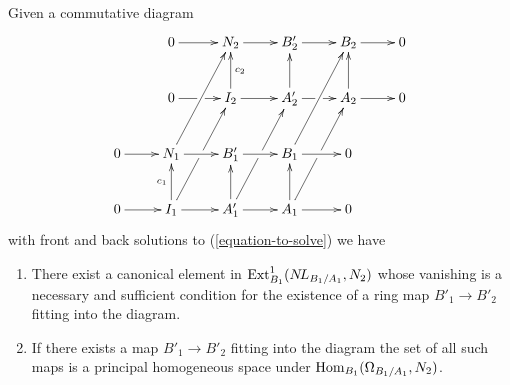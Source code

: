\begin{lemma}
\label{lemma-huge-diagram}
Given a commutative diagram
$$
\xymatrix{
& 0 \ar[r] & N_2 \ar[r] & B'_2 \ar[r] & B_2 \ar[r] & 0 \\
& 0 \ar[r]|\hole & I_2 \ar[u]_{c_2} \ar[r] &
A'_2 \ar[u] \ar[r]|\hole & A_2 \ar[u] \ar[r] & 0 \\
0 \ar[r] & N_1 \ar[ruu] \ar[r] & B'_1 \ar[r] & B_1 \ar[ruu] \ar[r] & 0 \\
0 \ar[r] & I_1 \ar[ruu]|\hole \ar[u]^{c_1} \ar[r] &
A'_1 \ar[ruu]|\hole \ar[u] \ar[r] & A_1 \ar[ruu]|\hole \ar[u] \ar[r] & 0
}
$$
with front and back solutions to (\ref{equation-to-solve}) we have
\begin{enumerate}
\item There exist a canonical element in
$\mathop{\mathrm{Ext}}\nolimits^1_{B_1}(\mathop{N\!L}\nolimits_{B_1/A_1}, N_2)$
whose vanishing is a necessary and sufficient condition for the existence
of a ring map $B'_1 \to B'_2$ fitting into the diagram.
\item If there exists a map $B'_1 \to B'_2$ fitting into the diagram
the set of all such maps is a principal homogeneous space under
$\mathop{\mathrm{Hom}}\nolimits_{B_1}(\Omega_{B_1/A_1}, N_2)$.
\end{enumerate}
\end{lemma}

